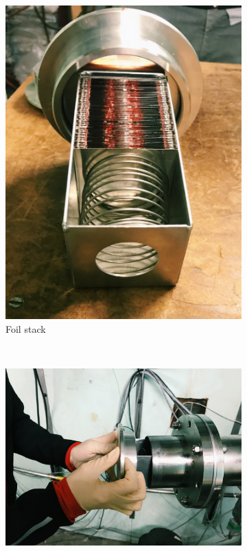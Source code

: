 \begin{figure}
    \centering
    \begin{subfigure}[b]{0.3\textwidth}
        \includegraphics[width=\textwidth]{Experiment/stack.JPG}
        \caption{Foil stack}
        \label{fig:stack}
    \end{subfigure}
    ~ %
    \begin{subfigure}[b]{0.3\textwidth}
        \includegraphics[width=\textwidth]{Experiment/tube.JPG}

\end{subfigure}
\end{figure}
